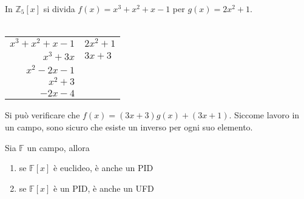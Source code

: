 \begin{esempio}
	In $\mathbb{Z}_5[x]$ si divida $f(x)=x^3+x^2+x-1$ per $g(x)=2x^2+1$.\\ \\
	\begin{center}
		\begin{tabular}{r|r}
			$x^3+x^2+x-1$ & \multicolumn{1}{l}{$2x^2+1$}  \\ 
			\cline{2-2}
			$x^3+3x$      & \multicolumn{1}{l}{$3x+3$}    \\ 
			\cline{1-1}
			$x^2-2x-1$    &                               \\
			$x^2+3$       &                               \\ 
			\cline{1-1}
			$-2x-4$       &                              
		\end{tabular}
	\end{center}
	Si può verificare che $f(x)=(3x+3)g(x)+(3x+1)$. Siccome lavoro in un campo, sono sicuro che esiste un inverso per ogni suo elemento.
\end{esempio}
\begin{teorema}
	Sia $\mathbb{F}$ un campo, allora 
	\begin{enumerate}
		\item se $\mathbb{F}[x]$ è euclideo, è anche un PID
		\item se $\mathbb{F}[x]$ è un PID, è anche un UFD
	\end{enumerate}
\end{teorema}


